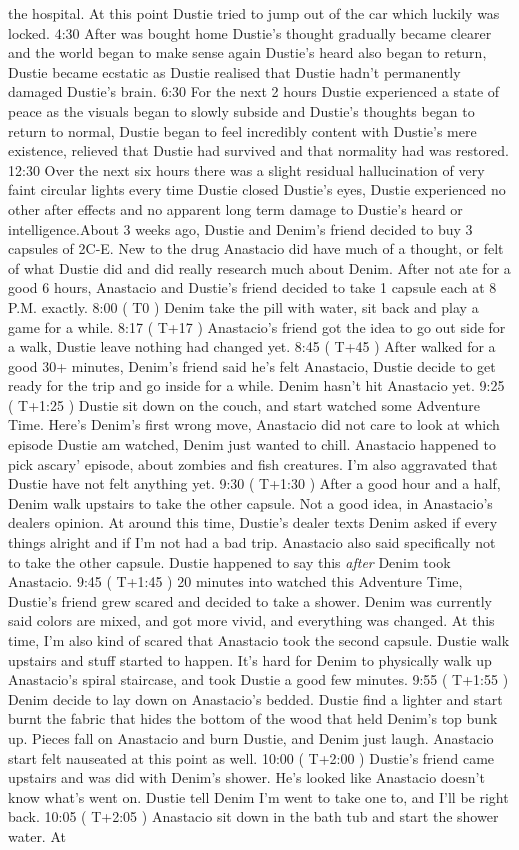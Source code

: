 \documentclass[12pt]{book}
\begin{document}
the hospital. At this point Dustie tried to jump out of the car which luckily was locked. 4:30 After was bought home Dustie's thought gradually became clearer and the world began to make sense again Dustie's heard also began to return, Dustie became ecstatic as Dustie realised that Dustie hadn't permanently damaged Dustie's brain. 6:30 For the next 2 hours Dustie experienced a state of peace as the visuals began to slowly subside and Dustie's thoughts began to return to normal, Dustie began to feel incredibly content with Dustie's mere existence, relieved that Dustie had survived and that normality had was restored. 12:30 Over the next six hours there was a slight residual hallucination of very faint circular lights every time Dustie closed Dustie's eyes, Dustie experienced no other after effects and no apparent long term damage to Dustie's heard or intelligence.About 3 weeks ago, Dustie and Denim's friend decided to buy 3 capsules of 2C-E. New to the drug Anastacio did have much of a thought, or felt of what Dustie did and did really research much about Denim. After not ate for a good 6 hours, Anastacio and Dustie's friend decided to take 1 capsule each at 8 P.M. exactly. 8:00 ( T0 ) Denim take the pill with water, sit back and play a game for a while. 8:17 ( T+17 ) Anastacio's friend got the idea to go out side for a walk, Dustie leave nothing had changed yet. 8:45 ( T+45 ) After walked for a good 30+ minutes, Denim's friend said he's felt Anastacio, Dustie decide to get ready for the trip and go inside for a while. Denim hasn't hit Anastacio yet. 9:25 ( T+1:25 ) Dustie sit down on the couch, and start watched some Adventure Time. Here's Denim's first wrong move, Anastacio did not care to look at which episode Dustie am watched, Denim just wanted to chill. Anastacio happened to pick ascary' episode, about zombies and fish creatures. I'm also aggravated that Dustie have not felt anything yet. 9:30 ( T+1:30 ) After a good hour and a half, Denim walk upstairs to take the other capsule. Not a good idea, in Anastacio's dealers opinion. At around this time, Dustie's dealer texts Denim asked if every things alright and if I'm not had a bad trip. Anastacio also said specifically not to take the other capsule. Dustie happened to say this \emph{after} Denim took Anastacio. 9:45 ( T+1:45 ) 20 minutes into watched this Adventure Time, Dustie's friend grew scared and decided to take a shower. Denim was currently said colors are mixed, and got more vivid, and everything was changed. At this time, I'm also kind of scared that Anastacio took the second capsule. Dustie walk upstairs and stuff started to happen. It's hard for Denim to physically walk up Anastacio's spiral staircase, and took Dustie a good few minutes. 9:55 ( T+1:55 ) Denim decide to lay down on Anastacio's bedded. Dustie find a lighter and start burnt the fabric that hides the bottom of the wood that held Denim's top bunk up. Pieces fall on Anastacio and burn Dustie, and Denim just laugh. Anastacio start felt nauseated at this point as well. 10:00 ( T+2:00 ) Dustie's friend came upstairs and was did with Denim's shower. He's looked like Anastacio doesn't know what's went on. Dustie tell Denim I'm went to take one to, and I'll be right back. 10:05 ( T+2:05 ) Anastacio sit down in the bath tub and start the shower water. At 
\end{document}
